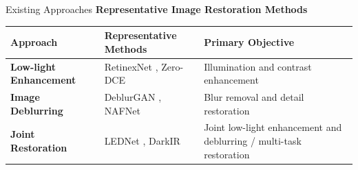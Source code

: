 ﻿\documentclass[
    11pt,%
    aspectratio=169,%
]{beamer}
\begin{document}
\begin{frame}{Existing Approaches}
\small
{\color{Navy}\bfseries
Representative Image Restoration Methods}

\vspace{0.12cm}

\renewcommand{\arraystretch}{1.5}

\begin{tabularx}{\textwidth}{
    >{\raggedright\arraybackslash}p{}
    >{\raggedright\arraybackslash}p{}
    >{\raggedright\arraybackslash}X
}

\toprule

\textbf{\color{Navy}Approach} &
\textbf{\color{Navy}Representative Methods} &
\textbf{\color{Navy}Primary Objective} \\

\midrule

\textbf{Low-light Enhancement} & RetinexNet \cite{wei2018retinexnet}, Zero-DCE \cite{guo2020zerodce} & Illumination and contrast enhancement \\
\textbf{Image Deblurring} & DeblurGAN \cite{kupyn2018deblurgan}, NAFNet \cite{chen2022nafnet} & Blur removal and detail restoration \\
\textbf{Joint Restoration} & LEDNet \cite{zhou2022lednet}, DarkIR \cite{feijoo2025darkir} & Joint low-light enhancement and deblurring / multi-task restoration \\
\bottomrule
\end{tabularx}
\vspace{0.3cm}
\end{frame} 
\end{document}
